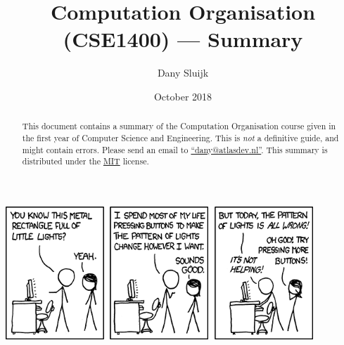 \documentclass[a4paper,12pt]{article}
\title{Computation Organisation (CSE1400) --- Summary}
\author{Dany Sluijk}
\date{October 2018}
\begin{document}
\maketitle
\begin{center}
	\includegraphics[height=5cm]{./intro}
\end{center}
\begin{abstract}
	This document contains a summary of the Computation Organisation course given
	in the first year of Computer Science and Engineering.
	This is \emph{not} a definitive guide, and might contain errors.
	Please send an email to \href{mailto:dany@atlasdev.nl}{``dany@atlasdev.nl''}.
	This summary is distributed under the
  \href{https://opensource.org/licenses/MIT}{MIT} license.
\end{abstract}

\newpage
\tableofcontents


\end{document}
